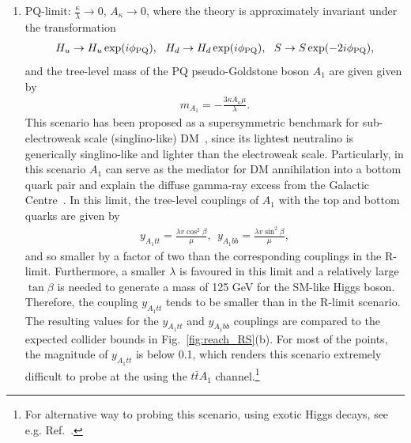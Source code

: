 \documentclass[preprintnumbers,superscriptaddress,nofootinbib,aps,prd,floatfix]{revtex4}
\begin{document}
\begin{enumerate}
\item PQ-limit: $\frac{\kappa}{\lambda} \to 0$, $A_\kappa \to 0$, where the theory is approximately invariant under the transformation 
\begin{eqnarray}
H_u \to H_u \exp(i \phi_{\rm PQ}), \ \ H_d \to H_d \exp(i \phi_{\rm PQ}), \ \ S \to S \exp(-2i \phi_{\rm PQ}), 
\end{eqnarray}
and the tree-level mass of the PQ pseudo-Goldstone boson $A_1$ are given given by  
\begin{eqnarray}
m_{A_1} = - \frac{3 \kappa A_\kappa \mu}{\lambda}.
\end{eqnarray}
This scenario has been proposed as a supersymmetric benchmark for sub-electroweak scale (singlino-like) DM~\cite{Draper:2010ew}, since its lightest neutralino is generically singlino-like and lighter than the electroweak scale. Particularly, in this scenario $A_1$ can serve as the mediator for  DM annihilation into a bottom quark pair and explain the diffuse gamma-ray excess from the Galactic Centre~\cite{Huang:2014cla,Cheung:2014lqa}. In this limit, the tree-level couplings of $A_1$ with the top and bottom quarks are given by 
\begin{eqnarray}
y_{A_1 tt} = \frac{\lambda v \cos^2 \beta}{\mu}, \ \ y_{A_1 bb} = \frac{\lambda v \sin^2 \beta}{\mu},
\end{eqnarray}
and so smaller by a factor of two than the corresponding couplings in the R-limit. Furthermore, a smaller $\lambda$ is favoured in this limit and a relatively large $\tan\beta$ is needed to generate a mass of 125 GeV for the SM-like Higgs boson. Therefore, the coupling $y_{A_1 tt}$ tends to be smaller than in the R-limit scenario. 
The resulting values for the $y_{A_1tt}$ and $y_{A_1bb}$ couplings are compared to the expected collider bounds in Fig.~\ref{fig:reach_RS}(b).
For most of the points, the magnitude of $y_{A_1 tt}$ is below 0.1, which renders this scenario extremely difficult to probe at the using the $t\bar tA_1$ channel.\footnote{For alternative way to probing this scenario, using exotic Higgs decays, see e.g. Ref.~\cite{Huang:2013ima,Huang:2014cla,Butter:2015fqa,Cao:2013gba}.}
 

\end{enumerate}
\end{document}
